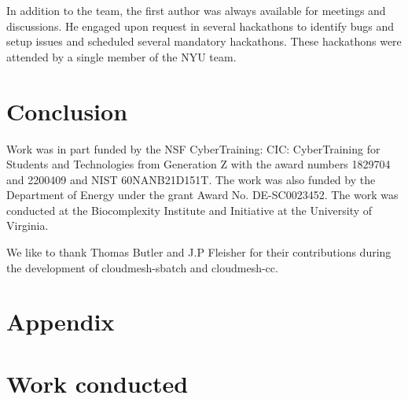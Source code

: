 \documentclass[sigplan,screen]{acmart}
\begin{document}

In addition to the team, the first author was always available for meetings and discussions. He engaged upon request in several hackathons to identify bugs and setup issues and scheduled several mandatory hackathons. These hackathons were attended by a single member of the NYU team. 

\section{Conclusion}
\label{sec:conclusion}


\begin{acks}

Work was in part funded by the NSF CyberTraining: CIC: CyberTraining for Students and Technologies from Generation Z with the award numbers 1829704 and 2200409 and NIST 60NANB21D151T.  The work was also funded by the Department of Energy under the grant Award No. DE-SC0023452. The work was conducted at the Biocomplexity Institute and Initiative at the University of Virginia.

We like to thank Thomas Butler and J.P Fleisher for their contributions during the development of cloudmesh-sbatch and cloudmesh-cc.

\end{acks}




\appendix


\section{Appendix}

\section{Work conducted}
\end{document}

